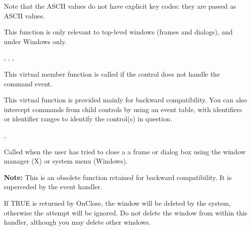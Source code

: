 Note that the ASCII values do not have explicit key codes: they are passed as ASCII
values.

This function is only relevant to top-level windows (frames and dialogs), and under
Windows only.


, ,\rtfsp
{},\rtfsp
{}

\label{wxwindowoncommand}


This virtual member function is called if the control does not handle the command event.





This virtual function is provided mainly for backward compatibility. You can also intercept commands
from child controls by using an event table, with identifiers or identifier ranges to identify
the control(s) in question.


,\rtfsp
{}

\label{wxwindowonclose}


Called when the user has tried to close a a frame
or dialog box using the window manager (X) or system menu (Windows).

{\bf Note:} This is an obsolete function retained for backward compatibility.
It is superceded by the  event
handler.


If TRUE is returned by OnClose, the window will be deleted by the system, otherwise the
attempt will be ignored. Do not delete the window from within this handler, although
you may delete other windows.


